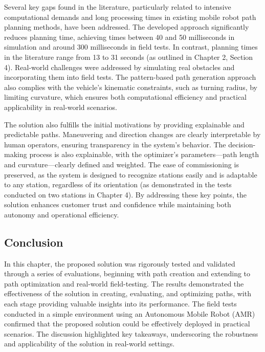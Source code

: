 Several key gaps found in the literature, particularly related to intensive computational demands and long 
processing times in existing mobile robot path planning methods, have been addressed. The developed approach 
significantly reduces planning time, achieving times between 40 and 50 milliseconds in simulation and around 
300 milliseconds in field tests. In contrast, planning times in the literature range from 13 to 31 seconds 
(as outlined in Chapter 2, Section 4). Real-world challenges were addressed by simulating real obstacles and 
incorporating them into field tests. The pattern-based path generation approach also complies with the vehicle's 
kinematic constraints, such as turning radius, by limiting curvature, which ensures both computational efficiency 
and practical applicability in real-world scenarios.

The solution also fulfills the initial motivations by providing explainable and predictable paths. Maneuvering 
and direction changes are clearly interpretable by human operators, ensuring transparency in the system’s behavior. 
The decision-making process is also explainable, with the optimizer’s parameters—path length and curvature—clearly 
defined and weighted. The ease of commissioning is preserved, as the system is designed to recognize stations 
easily and is adaptable to any station, regardless of its orientation (as demonstrated in the tests conducted on 
two stations in Chapter 4). By addressing these key points, the solution enhances customer trust and confidence 
while maintaining both autonomy and operational efficiency.

\subsection*{Conclusion}
In this chapter, the proposed solution was rigorously tested and validated through a series of evaluations, 
beginning with path creation and extending to path optimization and real-world field-testing. 
The results demonstrated the effectiveness of the solution in creating, evaluating, and optimizing paths, 
with each stage providing valuable insights into its performance. The field tests conducted in a simple 
environment using an Autonomous Mobile Robot (AMR) confirmed that the proposed solution could be effectively 
deployed in practical scenarios. The discussion highlighted key takeaways, underscoring the robustness 
and applicability of the solution in real-world settings.